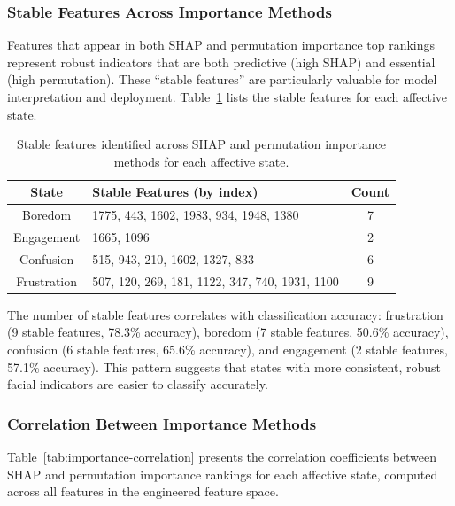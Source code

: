 \subsubsection{Stable Features Across Importance Methods}
\label{sec:stable-features}

Features that appear in both SHAP and permutation importance top rankings represent robust indicators that are both predictive (high SHAP) and essential (high permutation). These ``stable features'' are particularly valuable for model interpretation and deployment. Table~\ref{tab:stable-features} lists the stable features for each affective state.

\begin{table}[t]
\centering
\caption{Stable features identified across SHAP and permutation importance methods for each affective state.}
\label{tab:stable-features}
\begin{tabular}{cp{10cm}c}
\toprule
\textbf{State} & \textbf{Stable Features (by index)} & \textbf{Count} \\
\midrule
Boredom & 1775, 443, 1602, 1983, 934, 1948, 1380 & 7 \\
Engagement & 1665, 1096 & 2 \\
Confusion & 515, 943, 210, 1602, 1327, 833 & 6 \\
Frustration & 507, 120, 269, 181, 1122, 347, 740, 1931, 1100 & 9 \\
\bottomrule
\end{tabular}
\end{table}

The number of stable features correlates with classification accuracy: frustration (9 stable features, 78.3\% accuracy), boredom (7 stable features, 50.6\% accuracy), confusion (6 stable features, 65.6\% accuracy), and engagement (2 stable features, 57.1\% accuracy). This pattern suggests that states with more consistent, robust facial indicators are easier to classify accurately.

\subsubsection{Correlation Between Importance Methods}
\label{sec:importance-correlation}

Table~\ref{tab:importance-correlation} presents the correlation coefficients between SHAP and permutation importance rankings for each affective state, computed across all features in the engineered feature space.

